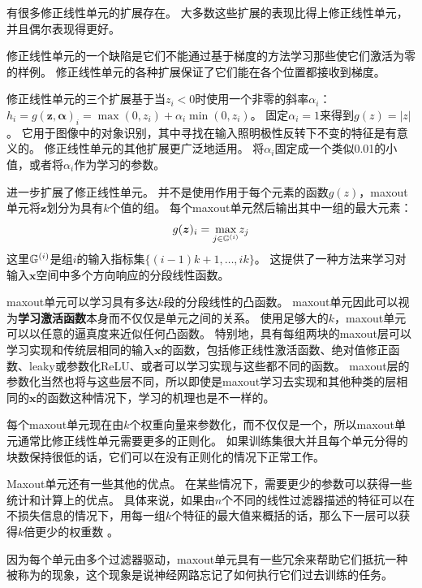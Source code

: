 有很多修正线性单元的扩展存在。
大多数这些扩展的表现比得上修正线性单元，并且偶尔表现得更好。

修正线性单元的一个缺陷是它们不能通过基于梯度的方法学习那些使它们激活为零的样例。
修正线性单元的各种扩展保证了它们能在各个位置都接收到梯度。

修正线性单元的三个扩展基于当$z_i<0$时使用一个非零的斜率$\alpha_i$：$h_i =g(\bm{z}, \bm{\alpha})_i = \max(0, z_i) + \alpha_i \min(0, z_i)$。
固定$\alpha_i=1$来得到$g(z)=|z|$。
它用于图像中的对象识别\citep{Jarrett-ICCV2009}，其中寻找在输入照明极性反转下不变的特征是有意义的。
修正线性单元的其他扩展更广泛地适用。
\citep{Maas-et-al-ICML2013}将$\alpha_i$固定成一个类似0.01的小值，或者\textbf{}将$\alpha_i$作为学习的参数\citep{He-et-al-arxiv2015}。


\citep{Goodfellow_maxout_2013}进一步扩展了修正线性单元。
并不是使用作用于每个元素的函数$g(z)$，maxout单元将$\bm{z}$划分为具有$k$个值的组。
每个maxout单元然后输出其中一组的最大元素：
\begin{equation}
g(\bm{z})_i = \underset{j\in \mathbb{G}^{(i)}}{\max} z_j
\end{equation}
这里$\mathbb{G}^{(i)}$是组$i$的输入指标集$\{(i-1)k+1, \ldots, ik\}$。
这提供了一种方法来学习对输入$\bm{x}$空间中多个方向响应的分段线性函数。

maxout单元可以学习具有多达$k$段的分段线性的凸函数。
maxout单元因此可以视为\textbf{学习激活函数}本身而不仅仅是单元之间的关系。
使用足够大的$k$，maxout单元可以以任意的逼真度来近似任何凸函数。
特别地，具有每组两块的maxout层可以学习实现和传统层相同的输入$\bm{x}$的函数，包括修正线性激活函数、绝对值修正函数、leaky或参数化ReLU、或者可以学习实现与这些都不同的函数。
maxout层的参数化当然也将与这些层不同，所以即使是maxout学习去实现和其他种类的层相同的$\bm{x}$的函数这种情况下，学习的机理也是不一样的。

每个maxout单元现在由$k$个权重向量来参数化，而不仅仅是一个，所以maxout单元通常比修正线性单元需要更多的正则化。
如果训练集很大并且每个单元分得的块数保持很低的话，它们可以在没有正则化的情况下正常工作\citep{cai2013deep}。

Maxout单元还有一些其他的优点。
在某些情况下，需要更少的参数可以获得一些统计和计算上的优点。
具体来说，如果由$n$个不同的线性过滤器描述的特征可以在不损失信息的情况下，用每一组$k$个特征的最大值来概括的话，那么下一层可以获得$k$倍更少的权重数 。

因为每个单元由多个过滤器驱动，maxout单元具有一些冗余来帮助它们抵抗一种被称为的现象，这个现象是说神经网路忘记了如何执行它们过去训练的任务\citep{Goodfellow+al-ICLR2014-small}。

